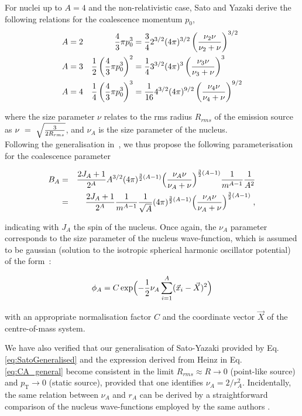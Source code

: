 \documentclass[a4paper,11pt]{scrartcl}
\begin{document}
\begin{appendix}
\noindent For nuclei up to $A = 4$ and the non-relativistic case, Sato and Yazaki derive the following relations for the coalescence momentum $p_{0}$, 
%
\begin{align}
	A& =2&
	{4 \over 3} \pi p_{0}^{3}& ={3 \over 4}2^{3/2}(4\pi)^{3/2} \left(\frac{\nu_{2}\nu}{\nu_{2} + \nu}\right)^{3/2}\\
	A& =3&
	{1 \over 2} \left( {4 \over 3} \pi p_{0}^{3}\right)^{2}& ={1 \over 4} 3^{3/2} (4\pi)^{3} \left(\frac{\nu_{3}\nu}{\nu_{3} + \nu}\right)^{3}\\
	A& =4&  
	{1 \over 4} \left({4 \over 3} \pi p_{0}^{3}\right)^{3}& = {1 \over 16} 4^{3/2} (4\pi)^{9/2} \left(\frac{\nu_{4}\nu}{\nu_{4}+ \nu}\right)^{9/2}
\end{align}

\noindent where the size parameter $\nu$ relates to the rms radius $R_{rms}$ of the emission source as $\nu~=~\sqrt{3 \over 2 R_{rms}}$, and $\nu_{A}$ is the size parameter of the nucleus. 
\\Following the generalisation in~\cite{Nagle:1996vp}, we thus propose the following parameterisation for the coalescence parameter

\begin{eqnarray}
B_{A} &=& {2J_{A} + 1 \over 2^{A}} A^{3/2} (4\pi)^{{3\over2}(A-1)} \Bigl({\nu_{A}\nu \over \nu_{A}+ \nu}\Bigr)^{{3\over2}(A-1)} {1 \over m^{A-1}} {1 \over A^{2}}  \\
\label{eq:SatoGeneralised}
           &=&  {2J_{A} + 1 \over 2^{A}} {1 \over m^{A-1}} {1 \over \sqrt{A}} (4\pi)^{{3\over2}(A-1)} \Bigl({\nu_{A}\nu \over \nu_{A}+ \nu}\Bigr)^{{3\over2}(A-1)} \;,
\end{eqnarray}

\noindent indicating with $J_{A}$ the spin of the nucleus.
Once again, the $\nu_{A}$ parameter corresponds to the size parameter of the nucleus wave-function, which is assumed to be gaussian (solution to the isotropic spherical harmonic oscillator potential) of the form~\cite{Sato:1981ez,Bergstrom:1979gpv}:

\begin{equation}\label{eq:SatoWave}
 \phi_{A} = C \exp\Bigl(-{1\over2} \nu_{A} \sum_{i=1}^{A}(\vec{x}_{i} - \vec{X})^2 \Bigr)
\end{equation}

\noindent with an appropriate normalisation factor $C$ and the coordinate vector $\vec{X}$ of the centre-of-mass system. 
 
We have also verified that our generalisation of Sato-Yazaki provided by Eq. \ref{eq:SatoGeneralised} and the expression derived from Heinz in Eq. \ref{eq:CA_general} become consistent in the limit $R_{rms} \approx R \rightarrow 0$ (point-like source) and $p_{\mathrm{T}} \rightarrow 0$ (static source), provided that one identifies $\nu_{A} = {2 / r_{A}^{2}}$. Incidentally, the same relation between $\nu_{A}$ and $r_{A}$ can be derived by a straightforward comparison of the nucleus wave-functions employed by the same authors \cite{Scheibl:1998tk,Sato:1981ez}. 


\end{appendix}
\end{document}
